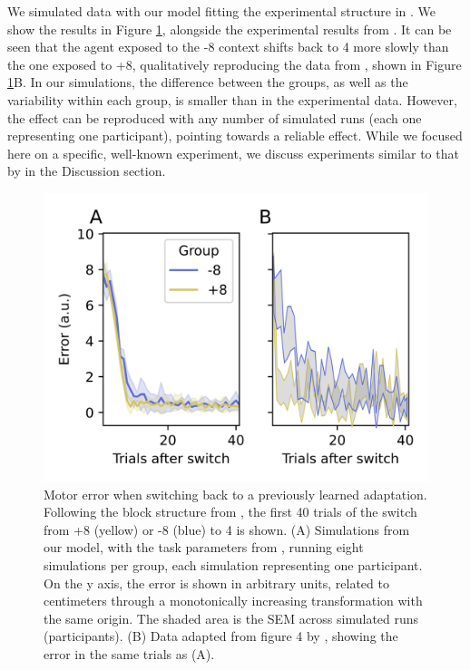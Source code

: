 \documentclass[a4paper,doc,floatsintext,natbib]{apa6}
\def \fref #1{Figure \ref{#1}}     %
\begin{document}
We simulated data with our model fitting the experimental structure in \cite{Davidson_Scaling_2004}. We show the results in \fref{fig:davidson-2004}, alongside the experimental results from \cite{Davidson_Scaling_2004}. It can be seen that the agent exposed to the -8 context shifts back to 4 more slowly than the one exposed to +8, qualitatively reproducing the data from \cite{Davidson_Scaling_2004}, shown in \fref{fig:davidson-2004}B. In our simulations, the difference between the groups, as well as the variability within each group, is smaller than in the experimental data. However, the effect can be reproduced with any number of simulated runs (each one representing one participant), pointing towards a reliable effect. While we focused here on a specific, well-known experiment, we discuss experiments similar to that by \cite{Davidson_Scaling_2004} in the Discussion section.

\begin{figure}
\centering
\includegraphics{./figures/figure_4.png}
\caption{Motor error when switching back to a previously learned adaptation. Following the block structure from \cite{Davidson_Scaling_2004}, the first 40 trials of the switch from +8 (yellow) or -8 (blue) to 4 is shown. (A) Simulations from our model, with the task parameters from \cite{Davidson_Scaling_2004}, running eight simulations per group, each simulation representing one participant. On the y axis, the error is shown in arbitrary units, related to centimeters through a monotonically increasing transformation with the same origin. The shaded area is the SEM across simulated runs (participants). (B) Data adapted from figure 4 by \cite{Davidson_Scaling_2004}, showing the error in the same trials as (A).}
\label{fig:davidson-2004}
\end{figure}
\end{document}
